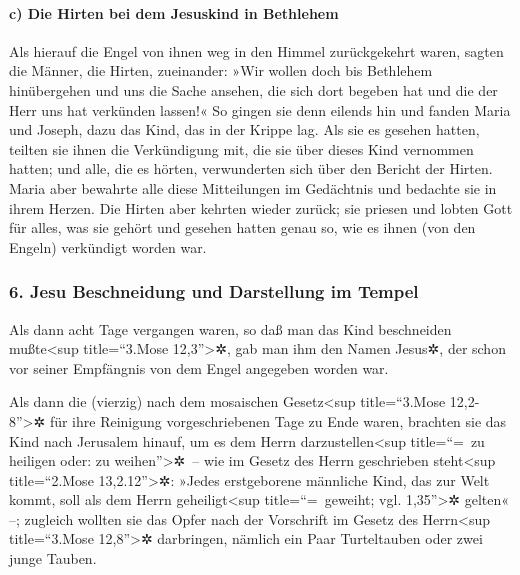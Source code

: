 \hypertarget{c-die-hirten-bei-dem-jesuskind-in-bethlehem}{%
\paragraph{c) Die Hirten bei dem Jesuskind in
Bethlehem}\label{c-die-hirten-bei-dem-jesuskind-in-bethlehem}}

 Als hierauf die Engel von ihnen weg in den Himmel
zurückgekehrt waren, sagten die Männer, die Hirten, zueinander: »Wir
wollen doch bis Bethlehem hinübergehen und uns die Sache ansehen, die
sich dort begeben hat und die der Herr uns hat verkünden lassen!«
 So gingen sie denn eilends hin und fanden Maria und
Joseph, dazu das Kind, das in der Krippe lag.  Als sie es
gesehen hatten, teilten sie ihnen die Verkündigung mit, die sie über
dieses Kind vernommen hatten;  und alle, die es hörten,
verwunderten sich über den Bericht der Hirten.  Maria
aber bewahrte alle diese Mitteilungen im Gedächtnis und bedachte sie in
ihrem Herzen.  Die Hirten aber kehrten wieder zurück; sie
priesen und lobten Gott für alles, was sie gehört und gesehen hatten
genau so, wie es ihnen (von den Engeln) verkündigt worden war.

\hypertarget{jesu-beschneidung-und-darstellung-im-tempel}{%
\subsubsection{6. Jesu Beschneidung und Darstellung im
Tempel}\label{jesu-beschneidung-und-darstellung-im-tempel}}

 Als dann acht Tage vergangen waren, so daß man das Kind
beschneiden mußte\textless sup title=``3.Mose 12,3''\textgreater✲, gab
man ihm den Namen Jesus✲, der schon vor seiner Empfängnis von dem Engel
angegeben worden war.

 Als dann die (vierzig) nach dem mosaischen
Gesetz\textless sup title=``3.Mose 12,2-8''\textgreater✲ für ihre
Reinigung vorgeschriebenen Tage zu Ende waren, brachten sie das Kind
nach Jerusalem hinauf, um es dem Herrn darzustellen\textless sup
title=``=~zu heiligen oder: zu weihen''\textgreater✲~-- 
wie im Gesetz des Herrn geschrieben steht\textless sup title=``2.Mose
13,2.12''\textgreater✲: »Jedes erstgeborene männliche Kind, das zur Welt
kommt, soll als dem Herrn geheiligt\textless sup title=``=~geweiht; vgl.
1,35''\textgreater✲ gelten« --;  zugleich wollten sie das
Opfer nach der Vorschrift im Gesetz des Herrn\textless sup
title=``3.Mose 12,8''\textgreater✲ darbringen, nämlich ein Paar
Turteltauben oder zwei junge Tauben.

